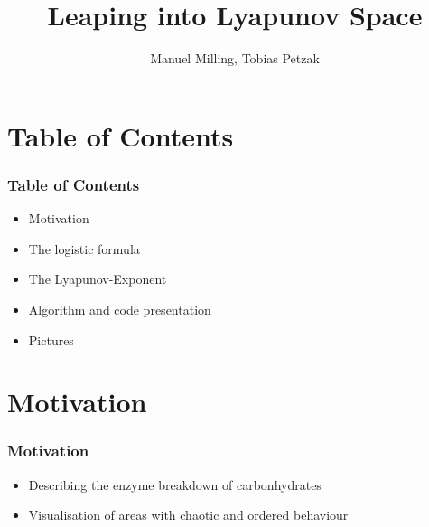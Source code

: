 \documentclass[ignorenonframetext]{beamer}
\title[]{Leaping into Lyapunov Space}
\subtitle{}
\author[Milling, Petzak]{\large{Manuel Milling, Tobias Petzak} \\
}
\institute[Universität Augsburg]{Institut für Physik der Universität Augsburg}
\date[26.08.2016]
\begin{document}
\frame[plain]{\titlepage}

\section*{Table of Contents}
\begin{frame}
\frametitle{Table of Contents}
\begin{itemize}
\item Motivation
\item The logistic formula
\item The Lyapunov-Exponent
\item Algorithm and code presentation
\item Pictures
\end{itemize}
\end{frame}

\section*{Motivation}

\begin{frame}
\frametitle{Motivation}
\begin{itemize}

\item Describing the enzyme breakdown of carbonhydrates
\item Visualisation of areas with chaotic and ordered behaviour
\end{itemize}
\end{frame}
\end{document}
